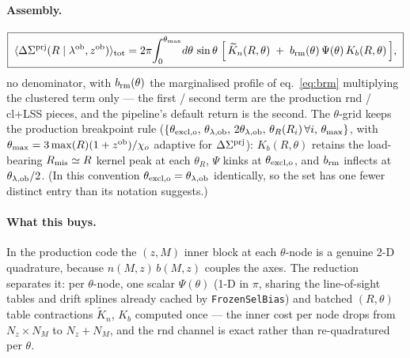 \documentclass[a4paper, 11pt]{article}
\newcommand{\lob}{\lambda^{\rm ob}}
\newcommand{\zob}{z^{\rm ob}}
\newcommand{\avg}[1]{\langle #1 \rangle}
\newcommand{\thob}{\theta_{\lambda,{\rm ob}}}
\newcommand{\brm}{b_{\rm rm}}
\newcommand{\DSprj}{\Delta\Sigma^{\rm prj}}
\newcommand{\Rmis}{R_{\rm mis}}
\begin{document}
\paragraph{Assembly.}
\begin{equation}
\boxed{\;
\avg{\DSprj(R\mid\lob,\zob)}_{\rm tot}
= 2\pi\!\int_0^{\theta_{\max}}\! d\theta\,\sin\theta\;
\Big[\, \widetilde K_n(R,\theta)
\;+\; \brm(\theta)\,\Psi(\theta)\,K_b(R,\theta) \,\Big],
\;}
\label{eq:DSprj_frozen}
\end{equation}
no denominator, with $\brm(\theta)$ the marginalised profile of
eq.~\eqref{eq:brm} multiplying the clustered term only --- the
first / second term are the production rnd / cl+LSS pieces, and
the pipeline's default return is the second. The $\theta$-grid
keeps the production breakpoint rule
($\{\theta_{\rm excl,o},\,\thob,\,2\thob,\,
\theta_R(R_i)\,\forall i,\,\theta_{\max}\}$, with
$\theta_{\max}=3\max(R)(1+\zob)/\chi_o$ adaptive for $\DSprj$):
$K_b(R,\theta)$ retains the load-bearing $\Rmis\simeq R$ kernel
peak at each $\theta_R$, $\Psi$ kinks at $\theta_{\rm excl,o}$,
and $\brm$ inflects at $\thob/2$. (In this convention
$\theta_{\rm excl,o}=\thob$ identically, so the set has one
fewer distinct entry than its notation suggests.)

\paragraph{What this buys.} In the production code the $(z,M)$
inner block at each $\theta$-node is a genuine 2-D quadrature,
because $n(M,z)\,b(M,z)$ couples the axes. The reduction
separates it: per $\theta$-node, one scalar $\Psi(\theta)$ (1-D
in $\pi$, sharing the line-of-sight tables and drift splines
already cached by \texttt{FrozenSelBias}) and batched
$(R,\theta)$ table contractions $\widetilde K_n$, $K_b$ computed
once --- the inner cost per node drops from $N_z\times N_M$ to
$N_z + N_M$, and the rnd channel is exact rather than
re-quadratured per $\theta$.
\end{document}
